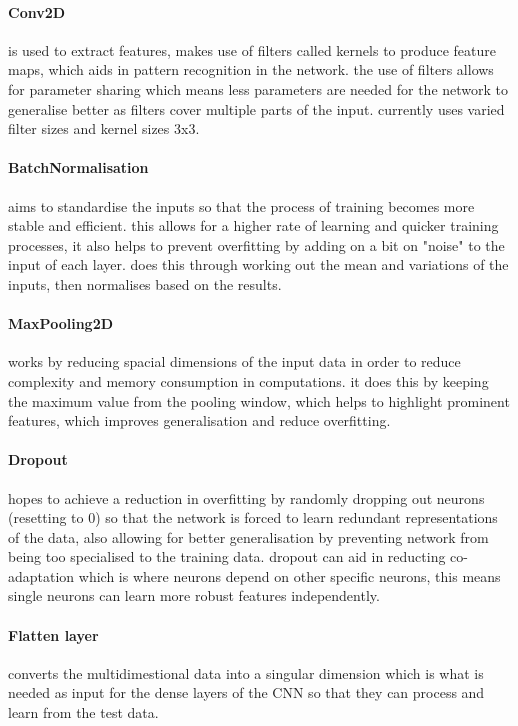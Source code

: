\documentclass[]{final_report}
\begin{document}
\paragraph{Conv2D} 
is used to extract features, makes use of filters called kernels to produce feature maps, which aids in pattern recognition in the network. the use of filters allows for parameter sharing which means less parameters are needed for the network to generalise better as filters cover multiple parts of the input. currently uses varied filter sizes and kernel sizes 3x3.

\paragraph{BatchNormalisation}
aims to standardise the inputs so that the process of training becomes more stable and efficient. this allows for a higher rate of learning and quicker training processes, it also helps to prevent overfitting by adding on a bit on "noise" to the input of each layer. does this through working out the mean and variations of the inputs, then normalises based on the results.

\paragraph{MaxPooling2D} 
works by reducing spacial dimensions of the input data in order to reduce complexity and memory consumption in computations. it does this by keeping the maximum value from the pooling window, which helps to highlight prominent features, which improves generalisation and reduce overfitting.

\paragraph{Dropout} 
hopes to achieve a reduction in overfitting by randomly dropping out neurons (resetting to 0) so that the network is forced to learn redundant representations of the data, also allowing for better generalisation by preventing network from being too specialised to the training data. dropout can aid in reducting co-adaptation which is where neurons depend on other specific neurons, this means single neurons can learn more robust features independently. 

\paragraph{Flatten layer}
converts the multidimestional data into a singular dimension which is what is needed as input for the dense layers of the CNN so that they can process and learn from the test data.
\end{document}
